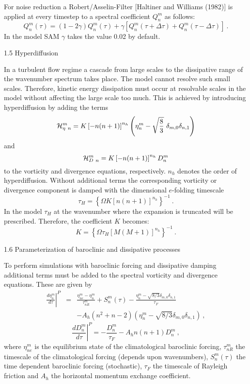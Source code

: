 For noise reduction a {\sc Robert}/{\sc Asselin}-Filter [Haltiner and Williams
(1982)]  is applied 
at every timestep to a spectral coefficient $Q_n^m$ as follows:
\begin{equation}
Q^m_n(\tau)=(1-2 \gamma)Q^m_n(\tau) 
+ \gamma [Q^m_n(\tau+\Delta \tau)+Q^m_n(\tau-\Delta \tau)]~.
\end{equation}
In the model SAM $\gamma$ takes the value 0.02 by default.

1.5 Hyperdiffusion

In a turbulent flow regime a cascade from large scales to the dissipative range 
of the wavenumber spectrum  takes place. The model cannot resolve such small scales.
Therefore, kinetic energy dissipation must occur at resolvable scales in the model without
affecting the large scale too much. This is achieved by introducing hyperdiffusion by
adding the terms
\begin{equation}
{\cal H}_{\eta~n}^m= K \left [ - n(n+1) \right ]^{n_h}    \left(\eta^m_n - \sqrt {\frac 8 3}~
 \delta_{m,0}\delta_{n,1}\right)
\end{equation}
and
\begin{equation}
{\cal H}_{D~n}^m= K \left [ - n(n+1) \right ]^{n_h}   D^m_n
\end{equation}
to the vorticity and divergence equations, respectively. $n_h$ denotes the order of 
hyperdiffusion. Without additional terms the corresponding vorticity or divergence component
is damped with the dimensional $e$-folding timescale
\begin{equation}
\tau_H= \left \{ \Omega K [n (n+1)]^{n_h} \right \}^{-1} ~.
\end{equation}
In the model $\tau_H$ at the wavenumber where the expansion is truncated will be prescribed.
Therefore, the coefficient $K$ becomes:
\begin{equation}
K= \left \{ \Omega \tau_H [M (M+1)]^{n_h} \right \}^{-1}~.
\end{equation}

1.6 Parameterization of baroclinic and dissipative processes

To perform simulations with baroclinic forcing and dissipative damping additional terms must
be added to the spectral vorticity and divergence equations.
These are given by
\begin{eqnarray}
\left . \frac {d \eta_n^m} {d\tau} \right |^P  & = & \frac {\eta_{ne}^m -\eta_n^m } {\tau^m_{nR}} 
+ S^m_n (\tau)
- \frac {\eta_n^m - \sqrt{8/3} \delta_{m,0} \delta_{n,1} } {\tau_F} \\ \nonumber
& & - A_{h} \left ( n^2 + n  - 2 \right )  
\left (\eta_n^m - \sqrt{8/3} \delta_{m,0} \delta_{n,1} \right ) ~, 
\end{eqnarray}
\begin{equation}
\left . \frac {d D_n^m} {d\tau}\right |^P  =  - \frac {D_n^m  } {\tau_F} -  A_{h}   { n (n+1)}  D^m_n ~,
\end{equation}
where $\eta_{ne}^m$ is the equilibrium state of the climatological baroclinic forcing, $\tau^m_{nR}$ the timescale of the
climatological forcing (depends upon wavenumbers), $S^m_n(\tau)$ the time dependent baroclinic forcing (stochastic),
$\tau_F$ the timescale of Rayleigh friction and $A_h$ the horizontal  momentum exchange coefficient.


